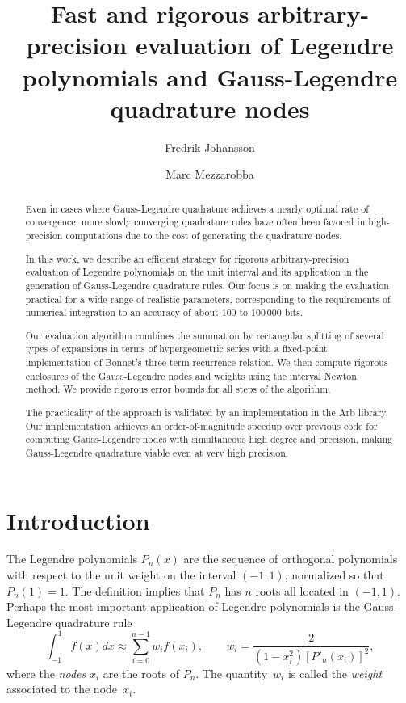 \documentclass[11pt,a4paper]{article}
\begin{document}
\title{Fast and rigorous arbitrary-precision evaluation of Legendre
polynomials and Gauss-Legendre quadrature nodes}
\author{Fredrik Johansson \and Marc Mezzarobba}
\date{}
\maketitle

\begin{abstract}
Even in cases where Gauss-Legendre quadrature achieves a nearly
optimal rate of convergence, more slowly converging quadrature rules
have often been favored in high-precision computations due to the cost
of generating the quadrature nodes.

In this work, we describe an efficient strategy for rigorous
arbitrary-precision evaluation of Legendre polynomials on the unit
interval and its application in the generation of Gauss-Legendre
quadrature rules.
Our focus is on making the evaluation practical for a wide range of
realistic parameters, corresponding to the requirements of numerical
integration to an accuracy of about $100$ to $100\,000$ bits.

Our evaluation algorithm combines the summation by rectangular
splitting of several types of expansions in terms of hypergeometric
series with a fixed-point implementation of Bonnet's three-term
recurrence relation.
We then compute rigorous enclosures of the Gauss-Legendre nodes and
weights using the interval Newton method.
We provide rigorous error bounds for all steps of the algorithm.

The practicality of the approach is validated by an implementation in
the Arb library.
Our implementation achieves an order-of-magnitude speedup over
previous code for computing Gauss-Legendre nodes with simultaneous
high degree and precision, making Gauss-Legendre quadrature viable
even at very high precision.
\end{abstract}

\section{Introduction}

The Legendre polynomials $P_n(x)$ are the sequence
of orthogonal polynomials with respect to the unit weight
on the interval $(-1,1)$, normalized so that $P_n(1) = 1$.
The definition implies that $P_n$ has $n$ roots all located in $(-1,1)$.
Perhaps the most important application of Legendre polynomials
is the Gauss-Legendre quadrature rule
\begin{equation}
\int_{-1}^{1} f(x) dx \approx \sum_{i=0}^{n-1} w_i f(x_i), \qquad
w_i = \frac{2}{(1-x_i^2) [P'_n(x_i)]^2},
\label{eq:glquad}
\end{equation}
where the \emph{nodes} $x_i$ are the roots of $P_n$.
The quantity~$w_i$ is called the \emph{weight} associated
to the node~$x_i$.
\end{document}
